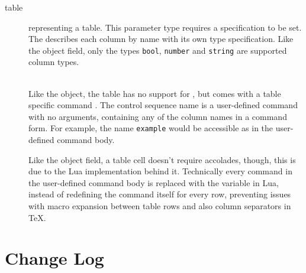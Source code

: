 \documentclass{ltxdoc}
\newcommand\showexample[5][15pt]{%
\begin{minipage}[t]{.5\linewidth - .5 \columnsep}%

\end{minipage}\hspace*{\columnsep}%
\begin{minipage}[t]{.5\linewidth - .5 \columnsep}%

\end{minipage}\\%
}
\begin{document}
\begin{description}
        \item[table] representing a table.
        This parameter type requires a  specification to be set.
        The  describes each column by name with its own type specification.
        Like the object field, only the types \texttt{bool}, \texttt{number} and \texttt{string} are supported column types.\\
        \showexample[20pt]{28}{28-36}{11}{11-15}
        \DescribeMacro{\fortablerow}
        Like the object, the table has no support for \cmd{\param}, but comes with a table specific command \cmd{\fortablerow}.
        The control sequence name  is a user-defined command with no arguments, containing any of the column names in a command form.
        For example, the name \texttt{example} would be accessible as \cmd{\example} in the user-defined command body.

        Like the object field, a table cell doesn't require accolades, though, this is due to the Lua implementation behind it.
        Technically every command in the user-defined command body is replaced with the variable in Lua, instead of redefining the command itself for every row, preventing issues with macro expansion between table rows and also column separators in \TeX{}.

    \end{description}

    \clearpage
    \addtolength\textwidth{2cm}%
    \setlength\linewidth{\textwidth}%
    \addtolength\oddsidemargin{-2cm}%
    \addtolength\evensidemargin{-1cm}%

    \printbibliography[heading=bibnumbered]

    \clearpage

    \section{Change Log}
    \newcommand\commitline[3]{\item #1\ifx&#3&%
    \else\\[1em]
    #3\fi\\\hspace*{1em} — \printdate{#2}}
    \newcommand\formatversion[3]{%
        \item[#1]
        \gittag[(taggerdate)(taggerdate:short)(authordate:short)]{printdate}{#1}
        \begin{itemize}
            \forgitcommit[s,as,b]{commitline}{#3}
        \end{itemize}
    }%
    \begin{description}
    \end{description}
\end{document}
